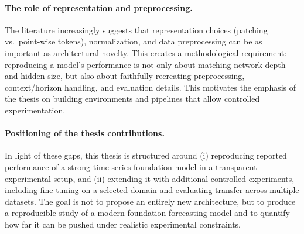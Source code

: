 \paragraph{The role of representation and preprocessing.}
The literature increasingly suggests that representation choices (patching vs.\ point-wise tokens), normalization, and data preprocessing can be as important as architectural novelty. This creates a methodological requirement: reproducing a model’s performance is not only about matching network depth and hidden size, but also about faithfully recreating preprocessing, context/horizon handling, and evaluation details. This motivates the emphasis of the thesis on building environments and pipelines that allow controlled experimentation.

\paragraph{Positioning of the thesis contributions.}
In light of these gaps, this thesis is structured around (i) reproducing reported performance of a strong time-series foundation model in a transparent experimental setup, and (ii) extending it with additional controlled experiments, including fine-tuning on a selected domain and evaluating transfer across multiple datasets. The goal is not to propose an entirely new architecture, but to produce a reproducible study of a modern foundation forecasting model and to quantify how far it can be pushed under realistic experimental constraints.






